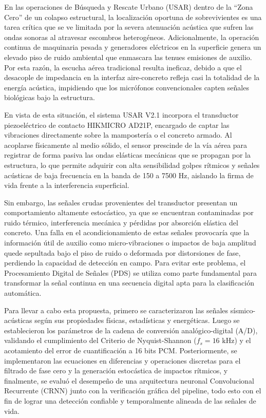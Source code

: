 \documentclass[journal, a4paper]{IEEEtran}
\begin{document}
En las operaciones de Búsqueda y Rescate Urbano (USAR) dentro de la ``Zona Cero'' de un colapso estructural, la localización oportuna de sobrevivientes es una tarea crítica que se ve limitada por la severa atenuación acústica que sufren las ondas sonoras al atravesar escombros heterogéneos. Adicionalmente, la operación continua de maquinaria pesada y generadores eléctricos en la superficie genera un elevado piso de ruido ambiental que enmascara las tenues emisiones de auxilio. Por esta razón, la escucha aérea tradicional resulta ineficaz, debido a que el desacople de impedancia en la interfaz aire-concreto refleja casi la totalidad de la energía acústica, impidiendo que los micrófonos convencionales capten señales biológicas bajo la estructura.

En vista de esta situación, el sistema USAR V2.1 incorpora el transductor piezoeléctrico de contacto HIKMICRO AD21P, encargado de captar las vibraciones directamente sobre la mampostería o el concreto armado. Al acoplarse físicamente al medio sólido, el sensor prescinde de la vía aérea para registrar de forma pasiva las ondas elásticas mecánicas que se propagan por la estructura, lo que permite adquirir con alta sensibilidad golpes rítmicos y señales acústicas de baja frecuencia en la banda de 150 a 7500 Hz, aislando la firma de vida frente a la interferencia superficial.

Sin embargo, las señales crudas provenientes del transductor presentan un comportamiento altamente estocástico, ya que se encuentran contaminadas por ruido térmico, interferencia mecánica y pérdidas por absorción elástica del concreto. Una falla en el acondicionamiento de estas señales provocaría que la información útil de auxilio como micro-vibraciones o impactos de baja amplitud quede sepultada bajo el piso de ruido o deformada por distorsiones de fase, perdiendo la capacidad de detección en campo. Para evitar este problema, el Procesamiento Digital de Señales (PDS) se utiliza como parte fundamental para transformar la señal continua en una secuencia digital apta para la clasificación automática.

Para llevar a cabo esta propuesta, primero se caracterizaron las señales sísmico-acústicas según sus propiedades físicas, estadísticas y energéticas. Luego se establecieron los parámetros de la cadena de conversión analógico-digital (A/D), validando el cumplimiento del Criterio de Nyquist-Shannon ($f_s = 16\text{ kHz}$) y el acotamiento del error de cuantificación a 16 bits PCM. Posteriormente, se implementaron las ecuaciones en diferencias y operaciones discretas para el filtrado de fase cero y la generación estocástica de impactos rítmicos, y finalmente, se evaluó el desempeño de una arquitectura neuronal Convolucional Recurrente (CRNN) junto con la verificación gráfica del pipeline, todo esto con el fin de lograr una detección confiable y temporalmente alineada de las señales de vida.
\end{document}
